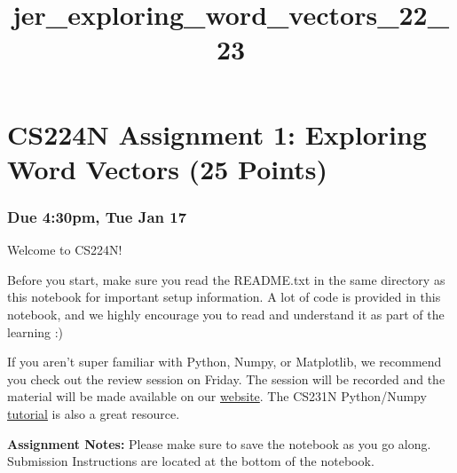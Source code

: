 \documentclass[11pt]{article}
\title{jer\_exploring\_word\_vectors\_22\_23}
\begin{document}
    
    \maketitle
    
    

    
    \section{CS224N Assignment 1: Exploring Word Vectors (25
Points)}\label{cs224n-assignment-1-exploring-word-vectors-25-points}

\subsubsection{\texorpdfstring{ Due 4:30pm, Tue Jan 17
}{ Due 4:30pm, Tue Jan 17 }}\label{due-430pm-tue-jan-17}

Welcome to CS224N!

Before you start, make sure you read the README.txt in the same
directory as this notebook for important setup information. A lot of
code is provided in this notebook, and we highly encourage you to read
and understand it as part of the learning :)

If you aren't super familiar with Python, Numpy, or Matplotlib, we
recommend you check out the review session on Friday. The session will
be recorded and the material will be made available on our
\href{http://web.stanford.edu/class/cs224n/index.html\#schedule}{website}.
The CS231N Python/Numpy
\href{https://cs231n.github.io/python-numpy-tutorial/}{tutorial} is also
a great resource.

\textbf{Assignment Notes:} Please make sure to save the notebook as you
go along. Submission Instructions are located at the bottom of the
notebook.
\end{document}
